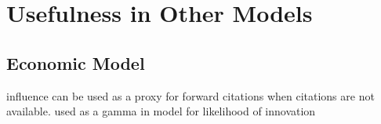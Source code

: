 
\chapter{Usefulness in Other Models} %

\label{Chapter5} %



\section{Economic Model}
influence can be used as a proxy for forward citations when citations are not available.
used as a gamma in model for likelihood of innovation


